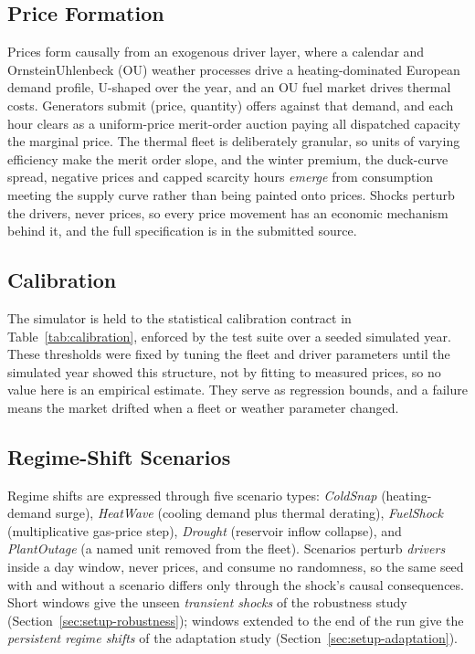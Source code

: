 \documentclass[conference]{IEEEtran}
\begin{document}
\subsection{Price Formation}

Prices form causally from an exogenous driver layer, where a calendar and Ornstein\textendash Uhlenbeck (OU) weather processes drive a heating-dominated European demand profile, U-shaped over the year, and an OU fuel market drives thermal costs. Generators submit (price, quantity) offers against that demand, and each hour clears as a uniform-price merit-order auction paying all dispatched capacity the marginal price. The thermal fleet is deliberately granular, so units of varying efficiency make the merit order slope, and the winter premium, the duck-curve spread, negative prices and capped scarcity hours \emph{emerge} from consumption meeting the supply curve rather than being painted onto prices. Shocks perturb the drivers, never prices, so every price movement has an economic mechanism behind it, and the full specification is in the submitted source.

\subsection{Calibration}
\label{sec:calibration}

The simulator is held to the statistical calibration contract in Table~\ref{tab:calibration}, enforced by the test suite over a seeded simulated year. These thresholds were fixed by tuning the fleet and driver parameters until the simulated year showed this structure, not by fitting to measured prices, so no value here is an empirical estimate. They serve as regression bounds, and a failure means the market drifted when a fleet or weather parameter changed.

\subsection{Regime-Shift Scenarios}
\label{sec:regime-scenarios}

Regime shifts are expressed through five scenario types: \emph{ColdSnap} (heating-demand surge), \emph{HeatWave} (cooling demand plus thermal derating), \emph{FuelShock} (multiplicative gas-price step), \emph{Drought} (reservoir inflow collapse), and \emph{PlantOutage} (a named unit removed from the fleet). Scenarios perturb \emph{drivers} inside a day window, never prices, and consume no randomness, so the same seed with and without a scenario differs only through the shock's causal consequences. Short windows give the unseen \emph{transient shocks} of the robustness study (Section~\ref{sec:setup-robustness}); windows extended to the end of the run give the \emph{persistent regime shifts} of the adaptation study (Section~\ref{sec:setup-adaptation}).
\end{document}
